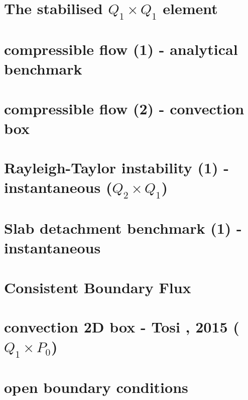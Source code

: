 \documentclass[a4paper,11pt]{report}
\begin{document}
\chapter{The stabilised $Q_1 \times Q_1$ element \label{f22}} %

\chapter{compressible flow (1) - analytical benchmark \label{f23}} %

\chapter{compressible flow (2) - convection box \label{f24}}


\chapter{Rayleigh-Taylor instability (1) - instantaneous ($Q_2\times Q_1$)\label{f25}}

\chapter{Slab detachment benchmark (1) - instantaneous \label{f26}}

\chapter{Consistent Boundary Flux \label{f27}} %

\chapter{convection 2D box - Tosi \etal, 2015 ($Q_1\times P_0$) \label{f28}} %

\chapter{open boundary conditions \label{f29}} 
\end{document}
